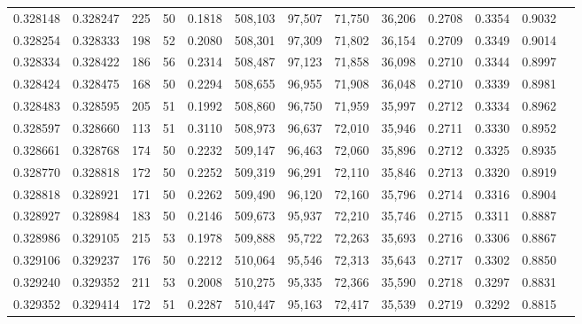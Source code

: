 \begin{tabular}{rrrrrrrrrrrrr}
0.328148 & 0.328247 &   225 &  50 &                                     0.1818 & 508,103 &  97,507 &  71,750 &  36,206 & 0.2708 & 0.3354 & 0.9032 \\
0.328254 & 0.328333 &   198 &  52 &                                     0.2080 & 508,301 &  97,309 &  71,802 &  36,154 & 0.2709 & 0.3349 & 0.9014 \\
0.328334 & 0.328422 &   186 &  56 &                                     0.2314 & 508,487 &  97,123 &  71,858 &  36,098 & 0.2710 & 0.3344 & 0.8997 \\
0.328424 & 0.328475 &   168 &  50 &                                     0.2294 & 508,655 &  96,955 &  71,908 &  36,048 & 0.2710 & 0.3339 & 0.8981 \\
0.328483 & 0.328595 &   205 &  51 &                                     0.1992 & 508,860 &  96,750 &  71,959 &  35,997 & 0.2712 & 0.3334 & 0.8962 \\
0.328597 & 0.328660 &   113 &  51 &                                     0.3110 & 508,973 &  96,637 &  72,010 &  35,946 & 0.2711 & 0.3330 & 0.8952 \\
0.328661 & 0.328768 &   174 &  50 &                                     0.2232 & 509,147 &  96,463 &  72,060 &  35,896 & 0.2712 & 0.3325 & 0.8935 \\
0.328770 & 0.328818 &   172 &  50 &                                     0.2252 & 509,319 &  96,291 &  72,110 &  35,846 & 0.2713 & 0.3320 & 0.8919 \\
0.328818 & 0.328921 &   171 &  50 &                                     0.2262 & 509,490 &  96,120 &  72,160 &  35,796 & 0.2714 & 0.3316 & 0.8904 \\
0.328927 & 0.328984 &   183 &  50 &                                     0.2146 & 509,673 &  95,937 &  72,210 &  35,746 & 0.2715 & 0.3311 & 0.8887 \\
0.328986 & 0.329105 &   215 &  53 &                                     0.1978 & 509,888 &  95,722 &  72,263 &  35,693 & 0.2716 & 0.3306 & 0.8867 \\
0.329106 & 0.329237 &   176 &  50 &                                     0.2212 & 510,064 &  95,546 &  72,313 &  35,643 & 0.2717 & 0.3302 & 0.8850 \\
0.329240 & 0.329352 &   211 &  53 &                                     0.2008 & 510,275 &  95,335 &  72,366 &  35,590 & 0.2718 & 0.3297 & 0.8831 \\
0.329352 & 0.329414 &   172 &  51 &                                     0.2287 & 510,447 &  95,163 &  72,417 &  35,539 & 0.2719 & 0.3292 & 0.8815 \\

\end{tabular}
